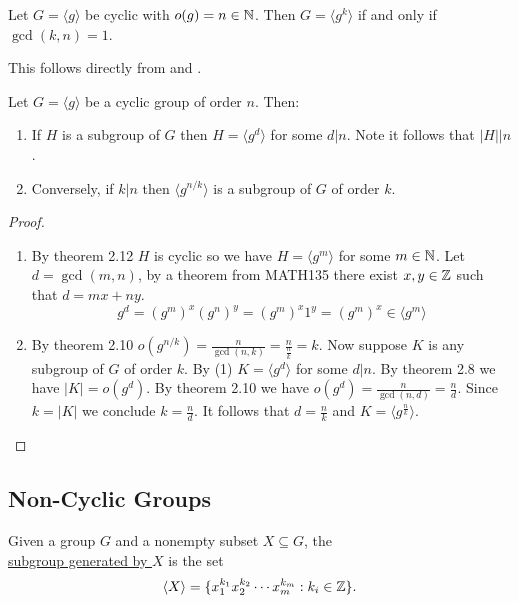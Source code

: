 \documentclass[11pt]{article}
\begin{document}
\begin{proposition}
    Let $G=\langle g\rangle$ be cyclic with $o(g)=n\in\mathbb{N}$. Then $G=\langle g^k\rangle$ if and only if $\gcd(k,n)=1$.
\end{proposition}

\proof This follows directly from  and .

\begin{theorem} Let $G=\langle g\rangle$ be a cyclic group of order $n$. Then:
\begin{enumerate}
    \item If $H$ is a subgroup of $G$ then $H=\langle g^d\rangle$ for some $d|n$. Note it follows that $|H|\big|n$.
    \item Conversely, if $k|n$ then $\langle g^{n/k}\rangle$ is a subgroup of $G$ of order $k$.
\end{enumerate}
\end{theorem}

\begin{proof}\,
    \begin{enumerate}
    \item By theorem 2.12 $H$ is cyclic so we have $H=\langle g^m\rangle$ for some $m\in\mathbb{N}$. Let $d=\gcd(m,n)$, by a theorem from MATH135 there exist $x,y\in\mathbb{Z}$ such that $d=mx+ny$.
    \[g^d=(g^m)^x(g^n)^y=(g^m)^x1^y=(g^m)^x\in\langle g^m\rangle\]

    \item By theorem 2.10 $o(g^{n/k})=\frac{n}{\gcd(n,k)}=\frac{n}{\frac{n}{k}}=k$. Now suppose $K$ is any subgroup of $G$ of order $k$. By (1) $K=\langle g^d\rangle$ for some $d|n$. By theorem 2.8 we have $|K|=o(g^d)$. By theorem 2.10 we have $o(g^d)=\frac{n}{\gcd(n,d)}=\frac{n}{d}$. Since $k=|K|$ we conclude $k=\frac{n}{d}$. It follows that $d=\frac{n}{k}$ and $K=\langle g^{\frac{n}{k}}\rangle$.
\end{enumerate}
\end{proof}

\subsection{Non-Cyclic Groups}

\begin{definition}
    Given a group $G$ and a nonempty subset $X\subseteq G$, the\\ \ul{subgroup generated by $X$} is the set
    \[\langle X\rangle=\{x_1^{k_1}x_2^{k_2}\cdots x_m^{k_m}:k_i\in\mathbb{Z}\}.\]
\end{definition}
\end{document}
